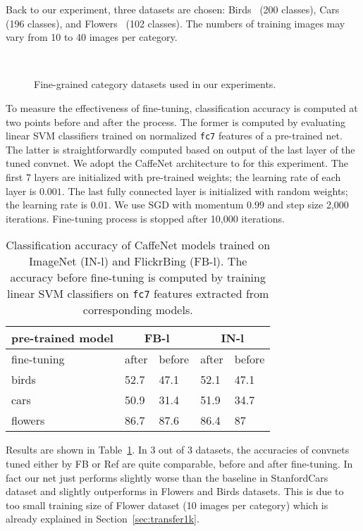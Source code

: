 \documentclass[preprint,12pt]{elsarticle}
\begin{document}
Back to our experiment, three datasets are chosen: Birds~\cite{WahCUB_200_2011} (200 classes), Cars~\cite{krause20133d} (196 classes), and Flowers~\cite{Nilsback08} (102 classes). The numbers of training images may vary from 10 to 40 images per category.
\begin{figure}[!t]
\centering 
{}\,
\,
\\
\caption{Fine-grained category datasets used in our experiments.}
\end{figure}

To measure the effectiveness of fine-tuning, classification accuracy is computed at two points before and after the process. The former is computed by evaluating linear SVM classifiers trained on normalized \texttt{fc7} features of a pre-trained net. The latter is straightforwardly computed based on output of the last layer of the tuned convnet. We adopt the CaffeNet architecture to for this experiment. The first 7 layers are initialized with pre-trained weights; the learning rate of each layer is $0.001$. The last fully connected layer is initialized with random weights; the learning rate is $0.01$. We use SGD with momentum $0.99$ and step size 2,000 iterations. Fine-tuning process is stopped after 10,000 iterations.
\begin{table}
\begin{centering}
\begin{tabular}{l|ll|ll}
pre-trained model & \multicolumn{2}{c}{FB-l} & \multicolumn{2}{c}{IN-l} \tabularnewline
\hline
fine-tuning & after & before & after & before \tabularnewline
 \hline\hline
birds~\cite{WahCUB_200_2011} & 52.7 & 47.1 & 52.1 & 47.1 \tabularnewline
cars~\cite{krause20133d} & 50.9 & 31.4 & 51.9 & 34.7 \tabularnewline
flowers~\cite{Nilsback08} & 86.7 & 87.6 & 86.4 & 87 \tabularnewline
\end{tabular}
\par\end{centering}
\caption{Classification accuracy of CaffeNet models trained on ImageNet (IN-l) and FlickrBing (FB-l). The accuracy before fine-tuning is computed by training linear SVM classifiers on \texttt{fc7} features extracted from corresponding models.}
\label{table:finecateg}
\end{table}

Results are shown in Table~\ref{table:finecateg}. In 3 out of 3 datasets, the accuracies of convnets tuned either by FB or Ref are quite comparable, before and after fine-tuning. In fact our net just performs slightly worse than the baseline in StanfordCars dataset and slightly outperforms in Flowers and Birds datasets. This is due to too small training size of Flower dataset (10 images per category) which is already explained in Section~\ref{sec:transfer1k}.
\end{document}
